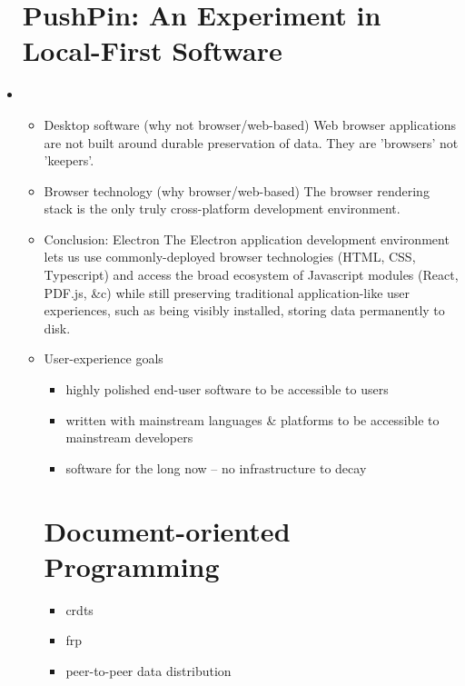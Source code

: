 \documentclass[sigplan,10pt]{acmart}
\begin{document}
\begin{itemize}
\section{PushPin: An Experiment in Local-First Software}
\item
    \begin{itemize}
    \item Desktop software (why not browser/web-based)
    Web browser applications are not built around durable preservation of data. They are 'browsers' not 'keepers'.
    \item Browser technology (why browser/web-based)
    The browser rendering stack is the only truly cross-platform development environment.
    \item Conclusion: Electron
    The Electron application development environment lets us use commonly-deployed browser technologies (HTML, CSS, Typescript) and access the broad ecosystem of Javascript modules (React, PDF.js, &c) while still preserving traditional application-like user experiences, such as being visibly installed, storing data permanently to disk.
    \item User-experience goals
    \begin{itemize}
        \item highly polished end-user software to be accessible to users
        \item written with mainstream languages \& platforms to be accessible to mainstream developers
        \item software for the long now -- no infrastructure to decay
    \end{itemize}

\section{Document-oriented Programming}
    \begin{itemize}
        \item crdts
        \item frp
        \item peer-to-peer data distribution
    \end{itemize}


\end{itemize}
\end{itemize}
\end{document}
